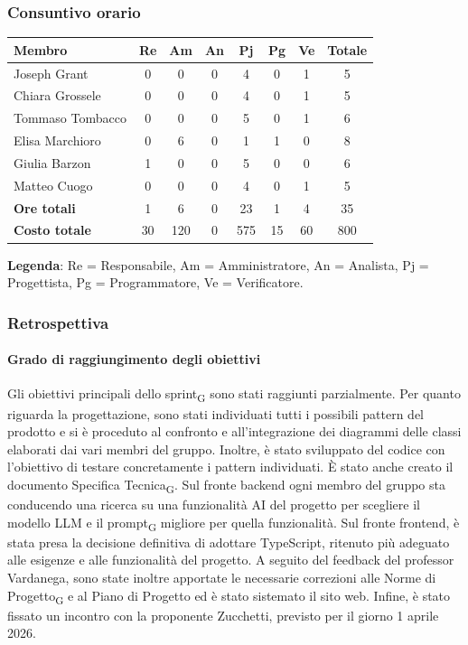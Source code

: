 \documentclass[11pt,a4paper]{article}
\newcommand{\gls}[1]{#1\textsubscript{G}}
\begin{document}
\subsubsection{Consuntivo orario}
\begin{center}
    \begin{tabular}{|l|c|c|c|c|c|c|c|}
        \hline
        \textbf{Membro} & \textbf{Re} & \textbf{Am} & \textbf{An} & \textbf{Pj} & \textbf{Pg} & \textbf{Ve} & \textbf{Totale} \\
        \hline
        Joseph Grant & 0 & 0 & 0 & 4 & 0 & 1 & 5\\
        \hline
        Chiara Grossele & 0 & 0 & 0 & 4 & 0 & 1 & 5\\
        \hline
        Tommaso Tombacco & 0 & 0 & 0 & 5 & 0 & 1 & 6\\
        \hline
        Elisa Marchioro & 0 & 6 & 0 & 1 & 1 & 0 & 8\\
        \hline
        Giulia Barzon & 1 & 0 & 0 & 5 & 0 & 0 & 6\\
        \hline
        Matteo Cuogo & 0 & 0 & 0 & 4 & 0 & 1 & 5\\
        \hline
        \textbf{Ore totali} & 1 & 6 & 0 & 23 & 1 & 4 & 35\\
        \hline
        \textbf{Costo totale} & 30 & 120 & 0 & 575 & 15 & 60 & 800\\
        \hline
    \end{tabular}
\end{center}

\noindent \textbf{Legenda}: Re = Responsabile, Am = Amministratore, An = Analista, Pj = Progettista, Pg = Programmatore, Ve = Verificatore.

\subsubsection{Retrospettiva}
\paragraph{Grado di raggiungimento degli obiettivi}
Gli obiettivi principali dello \gls{sprint} sono stati raggiunti parzialmente. Per quanto riguarda la progettazione, sono stati individuati tutti i possibili pattern del prodotto e si è proceduto al confronto e all’integrazione dei diagrammi delle classi elaborati dai vari membri del gruppo. Inoltre, è stato sviluppato del codice con l’obiettivo di testare concretamente i pattern individuati. È stato anche creato il documento \gls{Specifica Tecnica}.
Sul fronte backend ogni membro del gruppo sta conducendo una ricerca su una funzionalità AI del progetto per scegliere il modello LLM e il \gls{prompt} migliore per quella funzionalità.
Sul fronte frontend, è stata presa la decisione definitiva di adottare TypeScript, ritenuto più adeguato alle esigenze e alle funzionalità del progetto. A seguito del feedback del professor Vardanega, sono state inoltre apportate le necessarie correzioni alle \gls{Norme di Progetto} e al Piano di Progetto ed è stato sistemato il sito web.
Infine, è stato fissato un incontro con la proponente Zucchetti, previsto per il giorno 1 aprile 2026.
\end{document}

